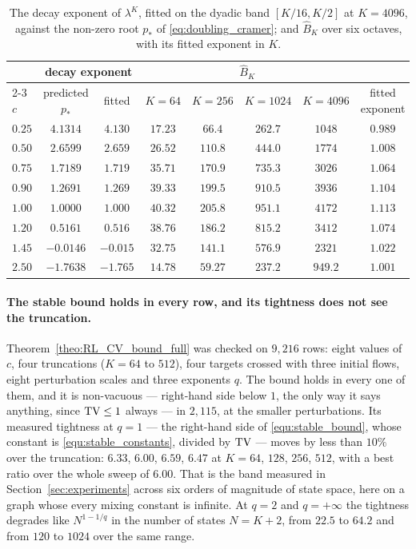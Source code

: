 \begin{table}[tb]
\centering
\small
\begin{tabular}{@{}lccccccc@{}}
\hline
 & \multicolumn{2}{c}{decay exponent} & \multicolumn{4}{c}{$\widehat B_K$} & \\
\cline{2-3}\cline{4-7}
$c$ & predicted $p_*$ & fitted & $K=64$ & $K=256$ & $K=1024$ & $K=4096$ & fitted exponent \\
\hline
$0.25$ & $4.1314$  & $4.130$  & $17.23$ & $66.4$  & $262.7$ & $1048$ & $0.989$ \\
$0.50$ & $2.6599$  & $2.659$  & $26.52$ & $110.8$ & $444.0$ & $1774$ & $1.008$ \\
$0.75$ & $1.7189$  & $1.719$  & $35.71$ & $170.9$ & $735.3$ & $3026$ & $1.064$ \\
$0.90$ & $1.2691$  & $1.269$  & $39.33$ & $199.5$ & $910.5$ & $3936$ & $1.104$ \\
$1.00$ & $1.0000$  & $1.000$  & $40.32$ & $205.8$ & $951.1$ & $4172$ & $1.113$ \\
$1.20$ & $0.5161$  & $0.516$  & $38.76$ & $186.2$ & $815.2$ & $3412$ & $1.074$ \\
$1.45$ & $-0.0146$ & $-0.015$ & $32.75$ & $141.1$ & $576.9$ & $2321$ & $1.022$ \\
$2.50$ & $-1.7638$ & $-1.765$ & $14.78$ & $59.27$ & $237.2$ & $949.2$ & $1.001$ \\
\hline
\end{tabular}
\caption{The decay exponent of $\lambda^K$, fitted on the dyadic band $[K/16,K/2]$ at
$K=4096$, against the non-zero root $p_*$ of \eqref{eq:doubling_cramer}; and $\widehat B_K$
over six octaves, with its fitted exponent in $K$.}
\label{tab:doubling_exponents}
\end{table}

\paragraph{The stable bound holds in every row, and its tightness does not see the truncation.}
Theorem~\ref{theo:RL_CV_bound_full} was checked on $9{,}216$ rows: eight values of $c$, four
truncations ($K=64$ to $512$), four targets crossed with three initial flows, eight
perturbation scales and three exponents $q$. The bound holds in every one of them, and it is
non-vacuous --- right-hand side below $1$, the only way it says anything, since $\mathrm{TV}\leq1$
always --- in $2{,}115$, at the smaller perturbations. Its measured tightness at $q=1$ --- the
right-hand side of \eqref{equ:stable_bound}, whose constant is \eqref{equ:stable_constants},
divided by $\mathrm{TV}$ --- moves by less than $10\%$ over the truncation:
$6.33$, $6.00$, $6.59$, $6.47$ at $K=64$, $128$, $256$, $512$, with a best ratio over the
whole sweep of $6.00$. That is the band measured in
Section~\ref{sec:experiments} across six orders of magnitude of state space, here on a graph
whose every mixing constant is infinite. At $q=2$ and $q=+\infty$ the tightness degrades like
$N^{1-1/q}$ in the number of states $N=K+2$, from $22.5$ to $64.2$ and from $120$ to $1024$
over the same range.

